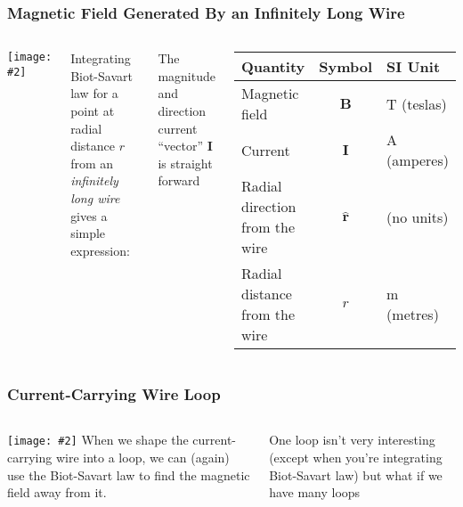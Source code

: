 \documentclass[12pt,aspectratio=169]{beamer}
\newcommand{\pic}[2]{\texttt{[image: \#2]}}
\newcommand{\mb}[1]{\mathbf{#1}}
\newcommand{\eq}[2]{\vspace{#1}{\Large\begin{displaymath}#2\end{displaymath}}}
\begin{document}
\begin{frame}
  \frametitle{Magnetic Field Generated By an Infinitely Long Wire}
  \begin{columns}
    \pic{1}{magcur2.png}
    
    Integrating Biot-Savart law for a point at radial distance $r$ from an
    \emph{infinitely long wire} gives a simple expression:

    \eq{-.35in}{
      \boxed{\mb{B}=\frac{\mu_0(\mb{I}\times\mb{\hat{r})}}{2\pi r}}
      \quad\text{or}\quad
      \boxed{B=\frac{\mu_0I}{2\pi r}}
    }

    \vspace{-.15in}The magnitude and direction current ``vector'' $\mb{I}$ is
    straight forward

    \vspace{-.3in}
    \begin{center}
      \begin{tabular}{l|c|l}
        \rowcolor{pink}
        \textbf{Quantity} & \textbf{Symbol} & \textbf{SI Unit} \\ \hline
        Magnetic field      & $\mb{B}$ & \si{T} (teslas)\\
        Current             & $\mb{I}$ & \si{A} (amperes)\\
        Radial direction from the wire & $\mb{\hat{r}}$ & (no units)\\
        Radial distance from the wire  & $r$            & \si{m} (metres)\\
      \end{tabular}
    \end{center}
  \end{columns}
\end{frame}


\begin{frame}
  \frametitle{Current-Carrying Wire Loop}
  \begin{columns}
    \pic{1}{curloo.png}
    When we shape the current-carrying wire into a loop, we can (again) use
    the Biot-Savart law to find the magnetic field away from it.

    \vspace{.2in}
    One loop isn't very interesting (except when you're integrating Biot-Savart
    law) but what if we have many loops
  \end{columns}
\end{frame}
\end{document}
